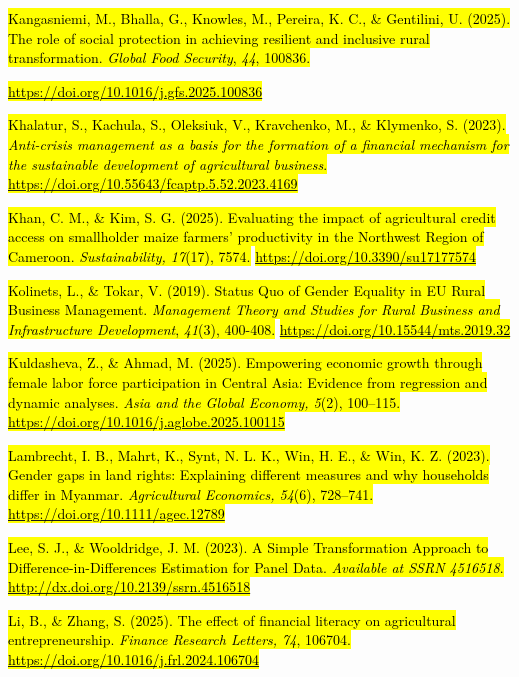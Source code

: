 \hl{Kangasniemi, M., Bhalla, G., Knowles, M., Pereira, K. C., \&
Gentilini, U. (2025). The role of social protection in achieving
resilient and inclusive rural transformation. \emph{Global Food
Security}, \emph{44}, 100836.}

\href{https://doi.org/10.1016/j.gfs.2025.100836}{\hl{https://doi.org/10.1016/j.gfs.2025.100836}}

\hl{Khalatur, S., Kachula, S., Oleksiuk, V., Kravchenko, M., \&
Klymenko, S. (2023). \emph{Anti-crisis management as a basis for the
formation of a financial mechanism for the sustainable development of
agricultural business}.}
\href{https://doi.org/10.55643/fcaptp.5.52.2023.4169}{\hl{https://doi.org/10.55643/fcaptp.5.52.2023.4169}}

\hl{Khan, C. M., \& Kim, S. G. (2025). Evaluating the impact of
agricultural credit access on smallholder maize farmers' productivity in
the Northwest Region of Cameroon. \emph{Sustainability, 17}(17), 7574.}
\href{https://doi.org/10.3390/su17177574}{\hl{https://doi.org/10.3390/su17177574}}

\hl{Kolinets, L., \& Tokar, V. (2019). Status Quo of Gender Equality in
EU Rural Business Management. \emph{Management Theory and Studies for
Rural Business and Infrastructure Development}, \emph{41}(3), 400-408.}
\href{https://doi.org/10.15544/mts.2019.32}{\hl{https://doi.org/10.15544/mts.2019.32}}

\hl{Kuldasheva, Z., \& Ahmad, M. (2025). Empowering economic growth
through female labor force participation in Central Asia: Evidence from
regression and dynamic analyses. \emph{Asia and the Global Economy,
5}(2), 100--115.}
\href{https://doi.org/10.1016/j.aglobe.2025.100115}{\hl{https://doi.org/10.1016/j.aglobe.2025.100115}}

\hl{Lambrecht, I. B., Mahrt, K., Synt, N. L. K., Win, H. E., \& Win, K.
Z. (2023). Gender gaps in land rights: Explaining different measures and
why households differ in Myanmar. \emph{Agricultural Economics, 54}(6),
728--741.}
\href{https://doi.org/10.1111\%2Fagec.12789}{\hl{https://doi.org/10.1111/agec.12789}}

\hl{Lee, S. J., \& Wooldridge, J. M. (2023). A Simple Transformation
Approach to Difference-in-Differences Estimation for Panel Data.
\emph{Available at SSRN 4516518}.}
\href{http://dx.doi.org/10.2139/ssrn.4516518.}{\hl{http://dx.doi.org/10.2139/ssrn.4516518}}

\hl{Li, B., \& Zhang, S. (2025). The effect of financial literacy on
agricultural entrepreneurship. \emph{Finance Research Letters, 74},
106704.}
\href{https://doi.org/10.1016/j.frl.2024.106704}{\hl{https://doi.org/10.1016/j.frl.2024.106704}}

